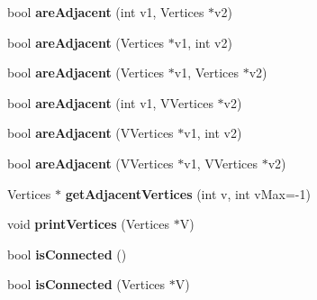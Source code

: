 \begin{DoxyCompactItemize}
\item 
\hypertarget{classGraph_ac7e4433df9f5bf2daf9b656ca10a9447}{bool {\bfseries are\-Adjacent} (int v1, Vertices $\ast$v2)}\label{classGraph_ac7e4433df9f5bf2daf9b656ca10a9447}

\item 
\hypertarget{classGraph_a79fc06c760894df4a0672f8dd0cad813}{bool {\bfseries are\-Adjacent} (Vertices $\ast$v1, int v2)}\label{classGraph_a79fc06c760894df4a0672f8dd0cad813}

\item 
\hypertarget{classGraph_a9b9d58195496532784648a94d14a06ad}{bool {\bfseries are\-Adjacent} (Vertices $\ast$v1, Vertices $\ast$v2)}\label{classGraph_a9b9d58195496532784648a94d14a06ad}

\item 
\hypertarget{classGraph_a32d5402eb9ff745b679a2790142fae10}{bool {\bfseries are\-Adjacent} (int v1, V\-Vertices $\ast$v2)}\label{classGraph_a32d5402eb9ff745b679a2790142fae10}

\item 
\hypertarget{classGraph_ac4067cfdb2add845e54ace0dd90bac3c}{bool {\bfseries are\-Adjacent} (V\-Vertices $\ast$v1, int v2)}\label{classGraph_ac4067cfdb2add845e54ace0dd90bac3c}

\item 
\hypertarget{classGraph_a2e9ee0363fc146ad0681bdbaae99028b}{bool {\bfseries are\-Adjacent} (V\-Vertices $\ast$v1, V\-Vertices $\ast$v2)}\label{classGraph_a2e9ee0363fc146ad0681bdbaae99028b}

\item 
\hypertarget{classGraph_a44b45c4abab348e84369d0ebcbb2c120}{Vertices $\ast$ {\bfseries get\-Adjacent\-Vertices} (int v, int v\-Max=-\/1)}\label{classGraph_a44b45c4abab348e84369d0ebcbb2c120}

\item 
\hypertarget{classGraph_aee018750b2ee25ffee6f23a53d38d2bb}{void {\bfseries print\-Vertices} (Vertices $\ast$V)}\label{classGraph_aee018750b2ee25ffee6f23a53d38d2bb}

\item 
\hypertarget{classGraph_add6f4a13a70d1b15f370db0bd4669b90}{bool {\bfseries is\-Connected} ()}\label{classGraph_add6f4a13a70d1b15f370db0bd4669b90}

\item 
\hypertarget{classGraph_a269433faeb00d19be87c79569ecec4a0}{bool {\bfseries is\-Connected} (Vertices $\ast$V)}\label{classGraph_a269433faeb00d19be87c79569ecec4a0}


\end{DoxyCompactItemize}
